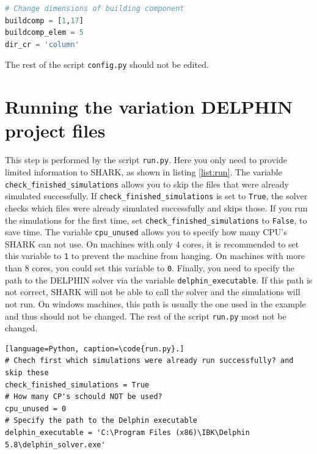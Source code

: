 \documentclass{article}
\newcommand{\file}[1]{{\small\texttt{#1}}}
\newcommand{\code}[1]{{\small\texttt{#1}}}
\begin{document}
\begin{minipage}{\linewidth}
\begin{lstlisting}[language=Python, caption=Define the building component of which the dimensions need to be changed.]
# Change dimensions of building component
buildcomp = [1,17]
buildcomp_elem = 5
dir_cr = 'column'
\end{lstlisting}
\label{list:buildcomp}
\end{minipage}

The rest of the script \file{config.py} should not be edited. 

\FloatBarrier

\section{Running the variation DELPHIN project files}
This step is performed by the script \file{run.py}. Here you only need to provide limited information to SHARK, as shown in listing \ref{list:run}. The variable \code{check\_finished\_simulations} allows you to skip the files that were already simulated successfully. If \code{check\_finished\_simulations} is set to \code{True}, the solver checks which files were already simulated successfully and skips those. If you run the simulations for the first time, set \code{check\_finished\_simulations} to \code{False}, to save time. The variable \code{cpu\_unused} allows you to specify how many CPU's SHARK can not use. On machines with only 4 cores, it is recommended to set this variable to \code{1} to prevent the machine from hanging. On machines with more than 8 cores, you could set this variable to \code{0}. Finally, you need to specify the path to the DELPHIN solver via the variable \code{delphin\_executable}. If this path is not correct, SHARK will not be able to call the solver and the simulations will not run. On windows machines, this path is usually the one used in the example and thus should not be changed. The rest of the script \file{run.py} most not be changed.

\begin{minipage}{\linewidth}
\begin{lstlisting}[language=Python, caption=\code{run.py}.]
# Chech first which simulations were already run successfully? and skip these
check_finished_simulations = True
# How many CP's schould NOT be used?
cpu_unused = 0
# Specify the path to the Delphin executable
delphin_executable = 'C:\Program Files (x86)\IBK\Delphin 5.8\delphin_solver.exe'
\end{lstlisting}
\label{list:run}
\end{minipage}
\end{document}
